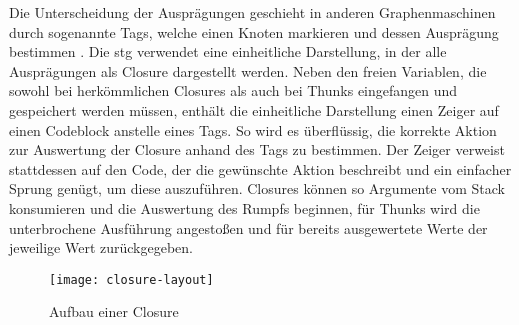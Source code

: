 Die Unterscheidung der Ausprägungen geschieht in anderen Graphenmaschinen durch sogenannte Tags, welche einen Knoten markieren und dessen Ausprägung bestimmen .
Die \gls{stg} verwendet eine einheitliche Darstellung, in der alle Ausprägungen als Closure dargestellt werden.
Neben den freien Variablen, die sowohl bei herkömmlichen Closures als auch bei Thunks eingefangen und gespeichert werden müssen, enthält die einheitliche Darstellung einen Zeiger auf einen Codeblock anstelle eines Tags.
So wird es überflüssig, die korrekte Aktion zur Auswertung der Closure anhand des Tags zu bestimmen.
Der Zeiger verweist stattdessen auf den Code, der die gewünschte Aktion beschreibt und ein einfacher Sprung genügt, um diese auszuführen.
Closures können so Argumente vom Stack konsumieren und die Auswertung des Rumpfs beginnen, für Thunks wird die unterbrochene Ausführung angestoßen und für bereits ausgewertete Werte der jeweilige Wert zurückgegeben.

\begin{figure}[h]
  \centering
  \texttt{[image: closure-layout]}
  \caption{Aufbau einer Closure}\label{fig:closure}
\end{figure}

